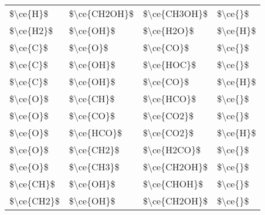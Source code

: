 \begin{tabular}{llll}
   \$\textbackslash ce\{H\}\$ &  \$\textbackslash ce\{CH2OH\}\$ &  \$\textbackslash ce\{CH3OH\}\$ &    \$\textbackslash ce\{\}\$ \\
  \$\textbackslash ce\{H2\}\$ &     \$\textbackslash ce\{OH\}\$ &    \$\textbackslash ce\{H2O\}\$ &   \$\textbackslash ce\{H\}\$ \\
   \$\textbackslash ce\{C\}\$ &      \$\textbackslash ce\{O\}\$ &     \$\textbackslash ce\{CO\}\$ &    \$\textbackslash ce\{\}\$ \\
   \$\textbackslash ce\{C\}\$ &     \$\textbackslash ce\{OH\}\$ &    \$\textbackslash ce\{HOC\}\$ &    \$\textbackslash ce\{\}\$ \\
   \$\textbackslash ce\{C\}\$ &     \$\textbackslash ce\{OH\}\$ &     \$\textbackslash ce\{CO\}\$ &   \$\textbackslash ce\{H\}\$ \\
   \$\textbackslash ce\{O\}\$ &     \$\textbackslash ce\{CH\}\$ &    \$\textbackslash ce\{HCO\}\$ &    \$\textbackslash ce\{\}\$ \\
   \$\textbackslash ce\{O\}\$ &     \$\textbackslash ce\{CO\}\$ &    \$\textbackslash ce\{CO2\}\$ &    \$\textbackslash ce\{\}\$ \\
   \$\textbackslash ce\{O\}\$ &    \$\textbackslash ce\{HCO\}\$ &    \$\textbackslash ce\{CO2\}\$ &   \$\textbackslash ce\{H\}\$ \\
   \$\textbackslash ce\{O\}\$ &    \$\textbackslash ce\{CH2\}\$ &   \$\textbackslash ce\{H2CO\}\$ &    \$\textbackslash ce\{\}\$ \\
   \$\textbackslash ce\{O\}\$ &    \$\textbackslash ce\{CH3\}\$ &  \$\textbackslash ce\{CH2OH\}\$ &    \$\textbackslash ce\{\}\$ \\
  \$\textbackslash ce\{CH\}\$ &     \$\textbackslash ce\{OH\}\$ &   \$\textbackslash ce\{CHOH\}\$ &    \$\textbackslash ce\{\}\$ \\
 \$\textbackslash ce\{CH2\}\$ &     \$\textbackslash ce\{OH\}\$ &  \$\textbackslash ce\{CH2OH\}\$ &    \$\textbackslash ce\{\}\$ \\
\bottomrule
\end{tabular}
